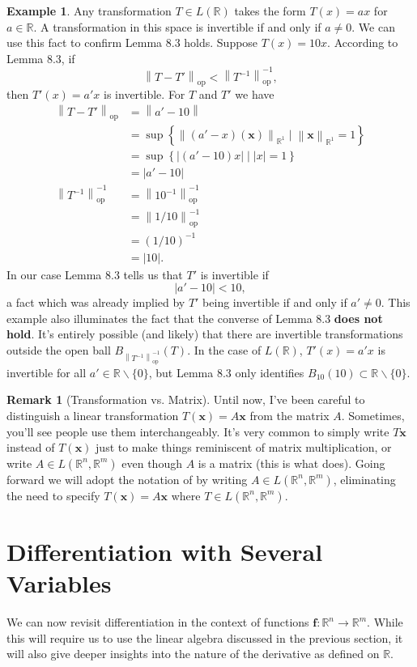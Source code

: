 \documentclass{article}
\newcommand{\R}{\mathbb{R}}
\newcommand{\x}{\mathbf{x}}
\newcommand{\f}{\mathbf{f}}
\newcommand{\norm}[1]{\left\lVert#1\right\rVert}
\newcommand{\normop}[1]{\left\lVert#1\right\rVert_\text{op}}
\theoremstyle{definition}
\newtheorem{example}{Example}[section]
\newtheorem{remark}{Remark}[section]
\begin{document}
	\begin{example}
		Any transformation $ T\in L(\R) $ takes the form $ T(x)=ax $ for $ a\in \R $. A transformation in this space is invertible if and only if $ a\neq 0 $. We can use this fact to confirm Lemma 8.3 holds. Suppose $ T(x)= 10x $. According to Lemma 8.3, if $$\normop{T-T'}<\normop{T^{-1}}^{-1}   ,$$ then $ T'(x)=a'x $ is invertible. For $ T $ and $ T' $ we have 
		\begin{align*}
			\normop{T-T'} & = \norm{a' - 10}\\ & =  \sup\left\{\norm{(a'-x)(\x)}_{\R^1}\mid \norm{\x}_{\R^1} = 1\right\} \\
			& =  \sup\left\{|(a'-10)x|\mid |x|=1\right\}\\ & = |a'-10|\\
			\normop{T^{-1}}^{-1} & = \normop{10^{-1}}^{-1} \\
			& = \normop{1/10}^{-1} \\
			& = (1/10)^{-1}\\
			& = |10|. 
		\end{align*}
		In our case Lemma 8.3 tells us that $ T' $ is invertible if $$ |a' - 10| < 10,$$ a fact which was already implied by $ T' $ being invertible if and only if $ a'\neq 0 $. This example also illuminates the fact that the converse of Lemma 8.3 \textbf{does not hold}. It's entirely possible (and likely) that there are invertible transformations outside the open ball $B_{\normop{T^{-1}}^{-1}}(T) $. In the case of $ L(\R) $, $ T'(x)=a'x $ is invertible for all $ a'\in \R\backslash\{0\} $, but Lemma 8.3 only identifies $ B_{10}(10)\subset\R\backslash\{0\}  $.  
	\end{example}
	\begin{remark}[Transformation vs. Matrix]
		Until now, I've been careful to distinguish a linear transformation $ T(\x)=A\x $ from the matrix $ A $. Sometimes, you'll see people use them interchangeably. It's very common to simply write $ T\x $ instead of $ T(\x) $ just to make things reminiscent of matrix multiplication, or write $ A\in L(\R^n, \R^m) $ even though $ A $ is a matrix (this is what \cite{rudin1964principles} does). Going forward we will adopt the notation of  \cite{rudin1964principles}  by writing $ A\in L(\R^n,\R^m) $, eliminating the need to specify $ T(\x)=A\x $ where $ T\in L(\R^n,\R^m) $. 
	\end{remark}
	\section{Differentiation with Several Variables}
	We can now revisit differentiation in the context of functions $ \f:\R^n\to\R^m $. While this will require us to use the linear algebra discussed in the previous section, it will also give deeper insights into the nature of the derivative as defined on $ \R $. 
\end{document}

